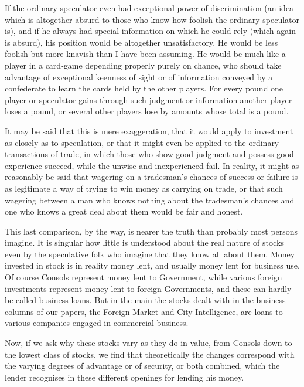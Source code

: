 \documentclass[letterpaper,12pt,oneside,openany]{memoir}
\begin{document}
If the ordinary speculator even had exceptional
power of discrimination (an idea which is altogether
absurd to those who know how foolish the ordinary
speculator is), and if he always had special information
on which he could rely (which again is absurd), his
position would be altogether unsatisfactory. He would
be less foolish but more knavish than I have been
assuming. He would be much like a player in a card-game
depending properly purely on chance, who should
take advantage of exceptional keenness of sight or of
information conveyed by a confederate to learn the
cards held by the other players. For every pound
one player or speculator gains through such judgment
or information another player loses a pound,
or several other players lose by amounts whose total
is a pound.

It may be said that this is mere exaggeration, that
it would apply to investment as closely as to speculation,
or that it might even be applied to the ordinary
transactions of trade, in which those who show good
judgment and possess good experience succeed, while
the unwise and inexperienced fail. In reality, it might
as reasonably be said that wagering on a tradesman's
chances of success or failure is as legitimate a way of
trying to win money as carrying on trade, or that such
wagering between a man who knows nothing about the
tradesman's chances and one who knows a great deal
about them would be fair and honest.

This last comparison, by the way, is nearer the
truth than probably most persons imagine. It is singular
how little is understood about the real nature of
stocks even by the speculative folk who imagine that
they know all about them. Money invested in stock
is in reality money lent, and usually money lent for
business use. Of course Consols represent money lent
to Government, while various foreign investments represent
money lent to foreign Governments, and these
can hardly be called business loans. But in the main
the stocks dealt with in the business columns of our
papers, the Foreign Market and City Intelligence, are
loans to various companies engaged in commercial
business.

Now, if we ask why these stocks vary as they do in
value, from Consols down to the lowest class of stocks,
we find that theoretically the changes correspond with
the varying degrees of advantage or of security, or both
combined, which the lender recognises in these different
openings for lending his money.
\end{document}
